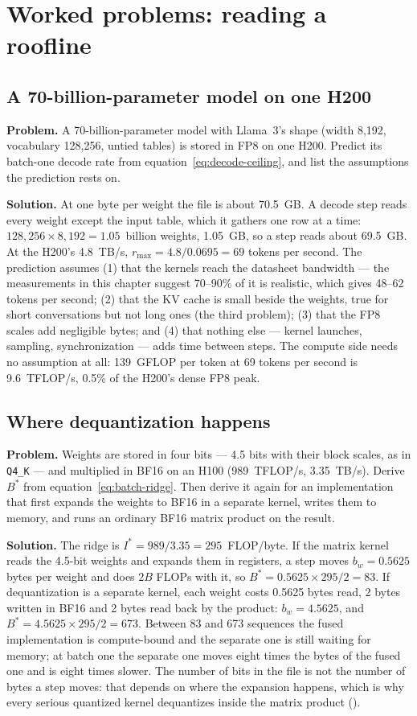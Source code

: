 \section{Worked problems: reading a roofline}

\subsection{A 70-billion-parameter model on one H200}
\textbf{Problem.} A 70-billion-parameter model with Llama~3's shape (width
8,192, vocabulary 128,256, untied tables) is stored in FP8 on one H200. Predict
its batch-one decode rate from equation~\eqref{eq:decode-ceiling}, and list the
assumptions the prediction rests on.

\textbf{Solution.} At one byte per weight the file is about 70.5~GB. A decode
step reads every weight except the input table, which it gathers one row at a
time: $128{,}256 \times 8{,}192 = 1.05$~billion weights, 1.05~GB, so a step
reads about 69.5~GB. At the H200's 4.8~TB/s, $r_{\max} = 4.8/0.0695 = 69$
tokens per second. The prediction assumes (1) that the kernels reach the
datasheet bandwidth --- the measurements in this chapter suggest 70--90\% of it
is realistic, which gives 48--62 tokens per second; (2) that the KV cache is
small beside the weights, true for short conversations but not long ones (the
third problem); (3) that the FP8 scales add negligible bytes; and (4) that
nothing else --- kernel launches, sampling, synchronization --- adds time
between steps. The compute side needs no assumption at all: 139~GFLOP per token
at 69 tokens per second is 9.6~TFLOP/s, 0.5\% of the H200's dense FP8 peak.

\subsection{Where dequantization happens}
\textbf{Problem.} Weights are stored in four bits --- 4.5 bits with their
block scales, as in \texttt{Q4\_K} --- and multiplied in BF16 on an H100
(989~TFLOP/s, 3.35~TB/s). Derive $B^{*}$ from equation~\eqref{eq:batch-ridge}.
Then derive it again for an implementation that first expands the weights to
BF16 in a separate kernel, writes them to memory, and runs an ordinary BF16
matrix product on the result.

\textbf{Solution.} The ridge is $I^{*} = 989/3.35 = 295$~FLOP/byte. If the
matrix kernel reads the 4.5-bit weights and expands them in registers, a step
moves $b_w = 0.5625$ bytes per weight and does $2B$ FLOPs with it, so
$B^{*} = 0.5625 \times 295 / 2 = 83$. If dequantization is a separate kernel,
each weight costs 0.5625 bytes read, 2 bytes written in BF16 and 2 bytes read
back by the product: $b_w = 4.5625$, and $B^{*} = 4.5625 \times 295/2 = 673$.
Between 83 and 673 sequences the fused implementation is compute-bound and the
separate one is still waiting for memory; at batch one the separate one moves
eight times the bytes of the fused one and is eight times slower. The number of
bits in the file is not the number of bytes a step moves: that depends on where
the expansion happens, which is why every serious quantized kernel dequantizes
inside the matrix product ().

